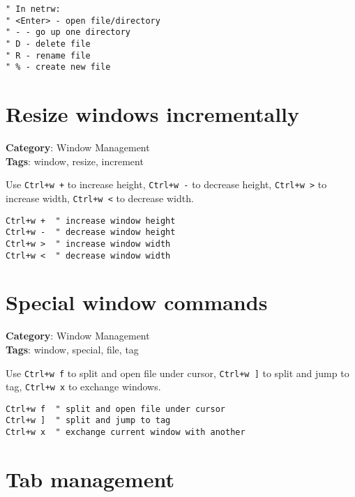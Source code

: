 {{{{{{{{{{{{{{{{{{\begin{Exa*}{}
\begin{Verbatim}[fontsize=\footnotesize, breaklines, breakanywhere]
" In netrw:
" <Enter> - open file/directory
" - - go up one directory
" D - delete file
" R - rename file
" % - create new file
\end{Verbatim}
\end{Exa*}

\section{Resize windows incrementally}

\textbf{Category}: Window Management\\ \textbf{Tags}: window, resize, increment
\vspace{0.5cm}

Use {\footnotesize \Verb§Ctrl+w +§} to increase height, {\footnotesize \Verb§Ctrl+w -§} to decrease height, {\footnotesize \Verb§Ctrl+w >§} to increase width, {\footnotesize \Verb§Ctrl+w <§} to decrease width.

\begin{Exa*}{}
\begin{Verbatim}[fontsize=\footnotesize, breaklines, breakanywhere]
Ctrl+w +  " increase window height
Ctrl+w -  " decrease window height
Ctrl+w >  " increase window width
Ctrl+w <  " decrease window width
\end{Verbatim}
\end{Exa*}

\section{Special window commands}

\textbf{Category}: Window Management\\ \textbf{Tags}: window, special, file, tag
\vspace{0.5cm}

Use {\footnotesize \Verb§Ctrl+w f§} to split and open file under cursor, {\footnotesize \Verb§Ctrl+w ]§} to split and jump to tag, {\footnotesize \Verb§Ctrl+w x§} to exchange windows.

\begin{Exa*}{}
\begin{Verbatim}[fontsize=\footnotesize, breaklines, breakanywhere]
Ctrl+w f  " split and open file under cursor
Ctrl+w ]  " split and jump to tag
Ctrl+w x  " exchange current window with another
\end{Verbatim}
\end{Exa*}

\section{Tab management}

}}}}}}}}}}}}}}}}}}
